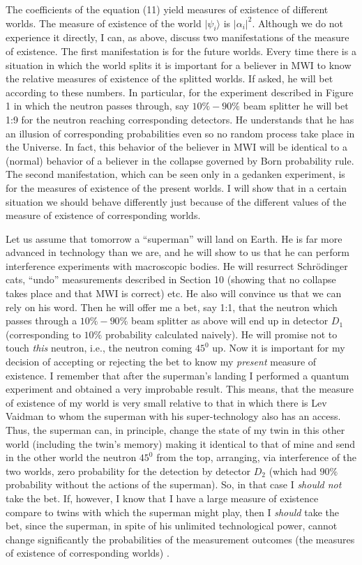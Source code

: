 The coefficients of the equation (11) yield measures of existence of
different worlds. The measure of existence of the world
$|\psi_i\rangle$ is $|\alpha_i|^2$.  Although we do not experience it
directly, I can, as above, discuss two manifestations of the measure
of existence.  The first manifestation is for the future worlds.
Every time there is a situation in which the world splits it is
important for a believer in MWI to know the relative measures of
existence of the splitted worlds.  If asked, he will bet according to
these numbers. In particular, for the experiment described in Figure 1
in which the neutron passes through, say $10\%-90\%$ beam splitter he
will bet 1:9 for the neutron reaching corresponding detectors. He
understands that he has an illusion of corresponding probabilities
even so no random process take place in the Universe. In fact, this
behavior of the believer in MWI will be identical to a (normal)
behavior of a believer in the collapse governed by Born probability
rule.
The second manifestation, which can be seen only in a gedanken
experiment, is for the measures of existence of the present worlds.  I
will show that in a certain situation we should behave differently
just because of the different values of the measure of existence of
corresponding worlds.

Let us assume that tomorrow a ``superman'' will land on Earth. He is
far more advanced in technology than we are, and he will show to us
that he can perform interference experiments with macroscopic bodies.
He will resurrect Schr\"odinger cats, ``undo'' measurements described
in Section 10 (showing that no collapse takes place and that MWI is
correct) etc.  He also will convince us that we can rely on his word.
Then he will offer me a bet, say 1:1, that the neutron which passes
through a $10\%-90\%$ beam splitter as above will end up in detector
$D_1$ (corresponding to $10\%$ probability calculated naively). He
will promise not to touch {\it this} neutron, i.e., the neutron coming
$45^0$ up. Now it is important for my decision of accepting or
rejecting the bet to know my {\it present} measure of existence. I
remember that after the superman's landing I performed a quantum
experiment and obtained a very improbable result. This means, that the
measure of existence of my world is very small relative to that in
which there is Lev Vaidman to whom the superman with his
super-technology also has an access. Thus, the superman can, in
principle, change the state of my twin in this other world (including
the twin's memory) making it identical to that of mine and send in the
other world the neutron $45^0$ from the top, arranging, via
interference of the two worlds, zero probability for the detection by
detector $D_2$ (which had $90\%$ probability without the actions of
the superman). So, in that case I {\it should not} take the bet. If,
however, I know that I have a large measure of existence compare to
twins with which the superman might play, then I {\it should} take the
bet, since the superman, in spite of his unlimited technological
power, cannot change significantly the probabilities of the
measurement outcomes (the measures of existence of corresponding
worlds) .





